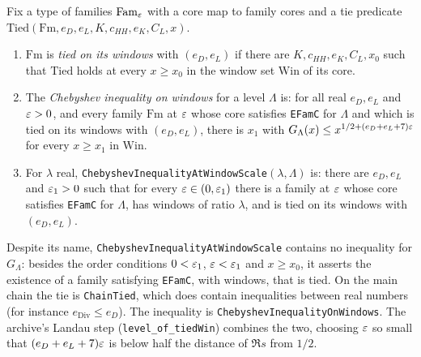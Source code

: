 \begin{definition}\label{geob:chebdefs}
Fix a type of families $\mathrm{Fam}_{\varepsilon}$ with a core map to family cores and a
tie predicate $\mathrm{Tied}(\mathrm{Fm},e_D,e_L,K,c_{HH},e_K,C_L,x)$.
\begin{enumerate}
\item $\mathrm{Fm}$ is \emph{tied on its windows} with $(e_D,e_L)$ if there are
$K,c_{HH},e_K,C_L,x_0$ such that $\mathrm{Tied}$ holds at every $x\ge x_0$ in
the window set $\mathrm{Win}$ of its core.
\item The \emph{Chebyshev inequality on windows} for a level $\Lambda$ is: for
all real $e_D,e_L$ and $\varepsilon>0$, and every family $\mathrm{Fm}$ at $\varepsilon$ whose
core satisfies \texttt{EFamC} for $\Lambda$ and which is tied on its windows
with $(e_D,e_L)$, there is $x_1$ with
$G_{\Lambda}(x)\le x^{1/2+(e_D+e_L+7)\varepsilon}$ for every $x\ge x_1$ in $\mathrm{Win}$.
\item For $\lambda$ real, \texttt{ChebyshevInequalityAtWindowScale}$(\lambda,\Lambda)$
is: there are $e_D,e_L$ and $\varepsilon_1>0$ such that for every $\varepsilon\in(0,\varepsilon_1)$
there is a family at $\varepsilon$ whose core satisfies \texttt{EFamC} for $\Lambda$,
has windows of ratio $\lambda$, and is tied on its windows with $(e_D,e_L)$.
\end{enumerate}
\end{definition}

\begin{remark}
Despite its name, \texttt{ChebyshevInequalityAtWindowScale} contains no
inequality for $G_{\Lambda}$: besides the order conditions $0<\varepsilon_1$, $\varepsilon<\varepsilon_1$
and $x\ge x_0$, it asserts the existence of a family satisfying \texttt{EFamC}, with
windows, that is tied. On the main chain the tie is \texttt{ChainTied}, which does contain
inequalities between real numbers (for instance $e_{\mathrm{Div}}\le e_D$).
The inequality is \texttt{ChebyshevInequalityOnWindows}. The archive's Landau
step (\texttt{level\_of\_tiedWin}) combines the two, choosing $\varepsilon$ so small
that $(e_D+e_L+7)\varepsilon$ is below half the distance of $\Re s$ from $1/2$.
\end{remark}

